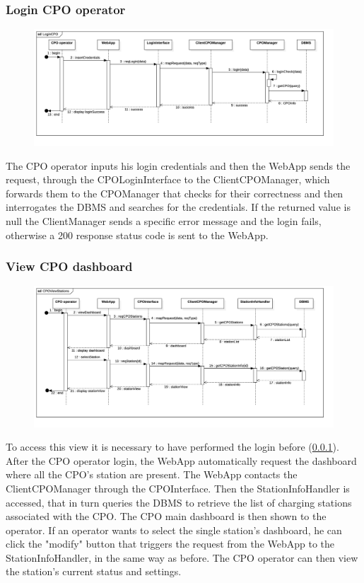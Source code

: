 \subsubsection{Login CPO operator}\label{cpo_login}
\begin{figure}[H]
    \begin{center}
        \includegraphics[width=\textwidth]{img/runtime/cpo_login}
    \end{center}
\end{figure}
The CPO operator inputs his login credentials and then the WebApp sends the request, through the CPOLoginInterface to the ClientCPOManager, which forwards them to the CPOManager that checks for their correctness and then interrogates the DBMS and searches for the credentials. If the returned value is null the ClientManager sends a specific error message and the login fails, otherwise a 200 response status code is sent to the WebApp.
\subsubsection{View CPO dashboard}
\begin{figure}[H]
    \begin{center}
        \includegraphics[width=\textwidth]{img/runtime/cpo_dashboard}
    \end{center}
\end{figure}
To access this view it is necessary to have performed the login before (\ref{cpo_login}). After the CPO operator login, the WebApp automatically request the dashboard where all the CPO's station are present. The WebApp contacts the ClientCPOManager through the CPOInterface. Then the StationInfoHandler is accessed, that in turn queries the DBMS to retrieve the list of charging stations associated with the CPO. The CPO main dashboard is then shown to the operator. If an operator wants to select the single station's dashboard, he can click the "modify" button that triggers the request from the WebApp to the StationInfoHandler, in the same way as before. The CPO operator can then view the station's current status and settings.
